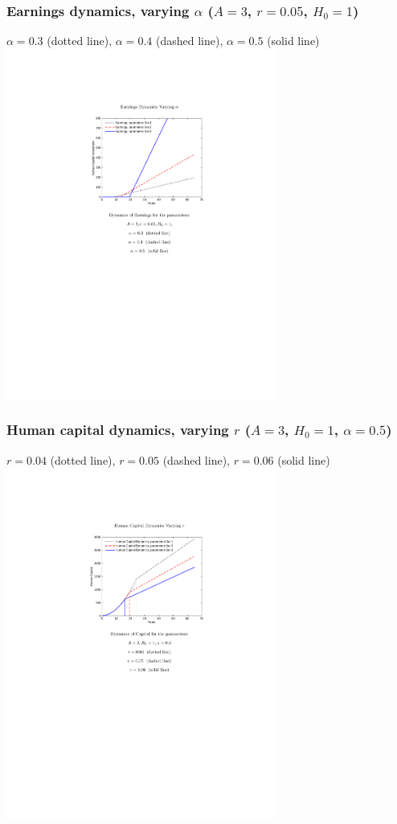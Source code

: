 \documentclass[12pt,compress,handout]{beamer}  %
\begin{document}
\begin{frame}
\frametitle{Earnings dynamics, varying $\alpha$ ($A=3$, $r=0.05$,
$H_{0}=1$)}
\begin{center}
{\footnotesize $\alpha =0.3$ (dotted line), $\alpha =0.4$ (dashed
line), $\alpha =0.5$ (solid line)}
\includegraphics[width=3.5in]{include/fig-hc-earn-series-03.pdf}
\end{center}
\end{frame}


\begin{frame}
\frametitle{Human capital dynamics, varying $r$ ($A=3$, $H_{0}=1$,
$\alpha=0.5$)}
\begin{center}
{\footnotesize $r =0.04$ (dotted line), $r =0.05$ (dashed line), $r
=0.06$ (solid line)}
\includegraphics[width=3.5in]{include/fig-hc-earn-series-04.pdf}
\end{center}
\end{frame}
\end{document}
